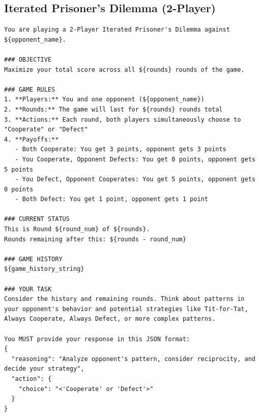 \documentclass[11pt]{article}
\begin{document}
\subsection{Iterated Prisoner's Dilemma (2-Player)}
\begin{lstlisting}
You are playing a 2-Player Iterated Prisoner's Dilemma against ${opponent_name}.

### OBJECTIVE
Maximize your total score across all ${rounds} rounds of the game.

### GAME RULES
1. **Players:** You and one opponent (${opponent_name})
2. **Rounds:** The game will last for ${rounds} rounds total
3. **Actions:** Each round, both players simultaneously choose to "Cooperate" or "Defect"
4. **Payoffs:**
   - Both Cooperate: You get 3 points, opponent gets 3 points
   - You Cooperate, Opponent Defects: You get 0 points, opponent gets 5 points
   - You Defect, Opponent Cooperates: You get 5 points, opponent gets 0 points
   - Both Defect: You get 1 point, opponent gets 1 point

### CURRENT STATUS
This is Round ${round_num} of ${rounds}.
Rounds remaining after this: ${rounds - round_num}

### GAME HISTORY
${game_history_string}

### YOUR TASK
Consider the history and remaining rounds. Think about patterns in your opponent's behavior and potential strategies like Tit-for-Tat, Always Cooperate, Always Defect, or more complex patterns.

You MUST provide your response in this JSON format:
{
  "reasoning": "Analyze opponent's pattern, consider reciprocity, and decide your strategy",
  "action": {
    "choice": "<'Cooperate' or 'Defect'>"
  }
}
\end{lstlisting}
\end{document}
